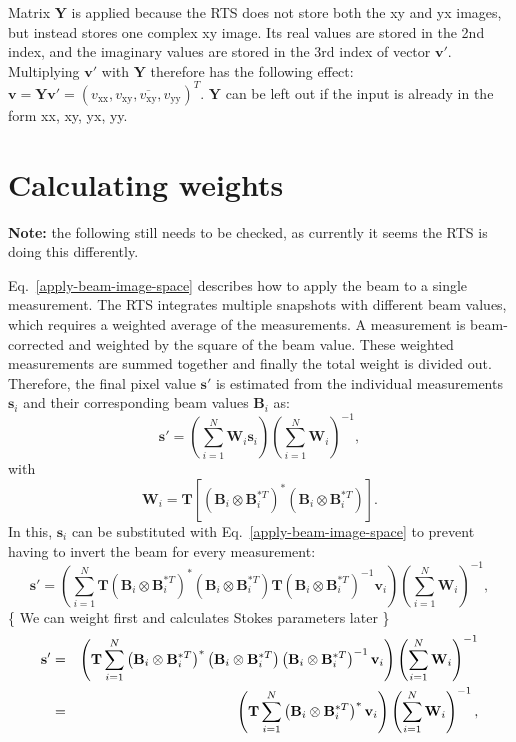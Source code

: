 \documentclass[a4paper,11pt]{article}
\begin{document}
Matrix $\mathbf{Y}$ is applied because the RTS does not store both the xy and yx images, but instead stores one complex xy image. Its real values are stored in the 2nd index, and the imaginary values are stored in the 3rd index of vector $\mathbf{v}'$. Multiplying $\mathbf{v}'$ with $\mathbf{Y}$ therefore has the following effect: $\mathbf{v}=\mathbf{Y}\mathbf{v}' = \left(v_\textrm{xx},v_\textrm{xy}, \overline{v_\textrm{xy}},v_\textrm{yy}\right)^T$. $\mathbf{Y}$ can be left out if the input is already in the form xx, xy, yx, yy.

\section{Calculating weights}
\textbf{Note:} the following still needs to be checked, as currently it seems the RTS is doing this differently.

Eq.~\ref{apply-beam-image-space} describes how to apply the beam to a single measurement. The RTS integrates multiple snapshots with different beam values, which requires a weighted average of the measurements. A measurement is beam-corrected and weighted by the square of the beam value. These weighted measurements are summed together and finally the total weight is divided out. Therefore, the final pixel value $\mathbf{s'}$ is estimated from the individual measurements $\mathbf{s}_i$ and their corresponding beam values $\mathbf{B}_i$ as:
\begin{equation} \label{eq:weighting}
\mathbf{s'} = \left( \sum\limits_{i=1}^N \textbf{W}_i \mathbf{s}_i \right) \left( \sum\limits_{i=1}^N \textbf{W}_i \right)^{-1},
\end{equation}
with
\begin{equation} \label{eq:weight-per-value}
\textbf{W}_i = \mathbf{T} \left[ \left(\mathbf{B}_i \otimes \mathbf{B}_i^{*T} \right)^* \left(\mathbf{B}_i \otimes \mathbf{B}_i^{*T} \right)\right].
\end{equation}
In this, $\mathbf{s}_i$ can be substituted with Eq.~\ref{apply-beam-image-space} to prevent having to invert the beam for every measurement:
\begin{equation}
\mathbf{s'} = 
\left(
  \sum\limits_{i=1}^N \mathbf{T} \left(\mathbf{B}_i \otimes \mathbf{B}_i^{*T} \right)^* \left(\mathbf{B}_i \otimes \mathbf{B}_i^{*T} \right) 
  \mathbf{T} \left(\mathbf{B}_i \otimes \mathbf{B}_i^{*T} \right)^{-1} \mathbf{v}_i
\right)
\left( \sum\limits_{i=1}^N \textbf{W}_i \right)^{-1},
\end{equation}
\{ We can weight first and calculates Stokes parameters later \}
\begin{eqnarray}
\notag
\mathbf{s'} & =  &
\left(
  \mathbf{T} \sum\limits_{i=1}^N \left(\mathbf{B}_i \otimes \mathbf{B}_i^{*T} \right)^* \left(\mathbf{B}_i \otimes \mathbf{B}_i^{*T} \right) 
  \left(\mathbf{B}_i \otimes \mathbf{B}_i^{*T} \right)^{-1} \mathbf{v}_i
\right)
\left( \sum\limits_{i=1}^N \textbf{W}_i \right)^{-1} \\
\label{eq:weighting-final}
& = &
\left(
  \mathbf{T} \sum\limits_{i=1}^N \left(\mathbf{B}_i \otimes \mathbf{B}_i^{*T} \right)^* \mathbf{v}_i
\right)
\left( \sum\limits_{i=1}^N \textbf{W}_i \right)^{-1},
\end{eqnarray}
\end{document}
